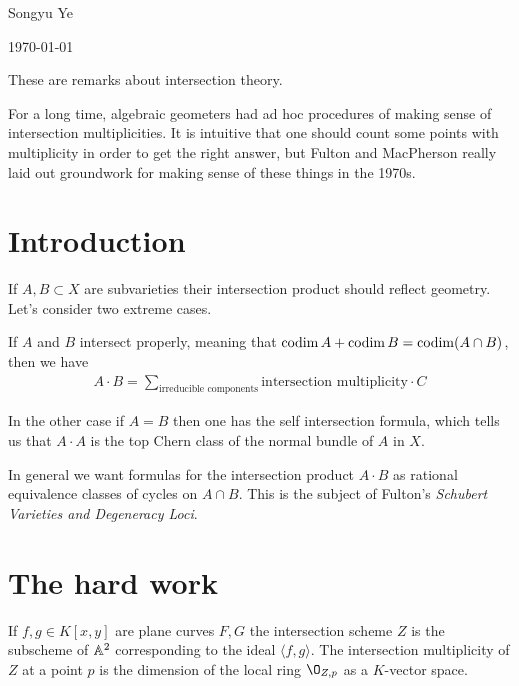 \documentclass[12pt]{article}
\begin{document}
Songyu Ye

\today

\hfill

These are remarks about intersection theory. 

For a long time, algebraic geometers had ad hoc procedures of making sense of intersection multiplicities.
It is intuitive that one should count some points with multiplicity in order to get the right answer,
but Fulton and MacPherson really laid out groundwork for making sense of these things in the 1970s.

\section{Introduction}
If $A,B\subset X$ are subvarieties their intersection product should reflect geometry.
Let's consider two extreme cases.

\hfill

If $A$ and $B$ intersect properly, meaning that $\operatorname{codim} A + \operatorname{codim} B = \operatorname{codim} (A\cap B)$, then we have 
\begin{align*}
    A\cdot B = \sum_{\text{irreducible components}} \text{intersection multiplicity}\cdot C
\end{align*}

\hfill

In the other case if $A = B$ then one has the self intersection formula, which tells us that $A\cdot A$ is the 
top Chern class of the normal bundle of $A$ in $X$.

\hfill

In general we want formulas for the intersection  product $A\cdot B$ as rational equivalence classes of cycles
on $A\cap B$. This is the subject of Fulton's \textit{Schubert Varieties and Degeneracy Loci}.

\section{The hard work}
\begin{definition}
    If $f,g\in K[x,y]$ are plane curves $F,G$ the intersection scheme $Z$ is the subscheme of $\mathbb{A}^2$ corresponding to the ideal 
    $\langle f,g\rangle$. The intersection multiplicity of $Z$ at a point $p$ is the dimension of the local ring $\O_{Z,p}$
    as a $K$-vector space.
\end{definition}
\end{document}
